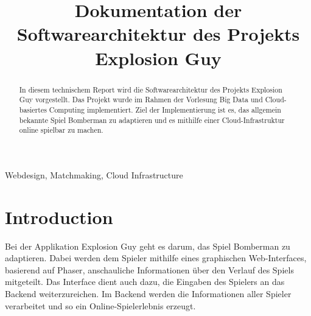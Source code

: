 \documentclass[conference]{IEEEtran}
\begin{document}
\title{Dokumentation der Softwarearchitektur des Projekts Explosion Guy}


\author{
	\and

	\and

	\and

	\and

}

\maketitle

\begin{abstract}
In diesem technischem Report wird die Softwarearchitektur des Projekts 
Explosion Guy vorgestellt. Das Projekt wurde im Rahmen der Vorlesung Big Data und Cloud-basiertes Computing implementiert. Ziel der Implementierung ist es, 
das allgemein bekannte Spiel \glqq Bomberman\grqq{} zu adaptieren und es mithilfe einer Cloud-Infrastruktur online spielbar zu machen.\\
\end{abstract}

\begin{IEEEkeywords}
 Webdesign, Matchmaking, Cloud Infrastructure
\end{IEEEkeywords}

\section{Introduction}
Bei der Applikation Explosion Guy geht es darum, das Spiel \glqq Bomberman\grqq{} zu adaptieren. Dabei werden dem Spieler mithilfe eines graphischen Web-Interfaces, basierend auf Phaser\cite{phaser}, anschauliche Informationen über den Verlauf des Spiels mitgeteilt. Das Interface dient auch dazu, die Eingaben des Spielers an das Backend weiterzureichen. Im Backend werden die Informationen aller Spieler verarbeitet und so ein Online-Spielerlebnis erzeugt.
\end{document}
